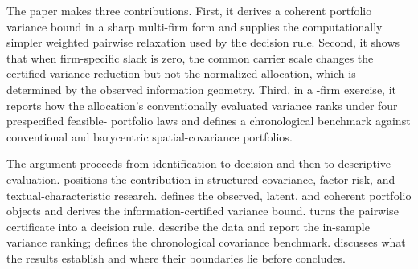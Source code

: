 The paper makes three contributions.
First, it derives a coherent portfolio variance bound in a sharp
multi-firm form and supplies the computationally simpler weighted
pairwise relaxation used by the decision rule.
Second, it shows that when firm-specific slack is zero, the common
carrier scale changes the certified variance reduction but not the
normalized allocation, which is determined by the observed information geometry.
Third, in a -firm exercise, it reports how the allocation's
conventionally evaluated variance ranks under four prespecified feasible-
portfolio laws and defines a chronological benchmark against conventional and
barycentric spatial-covariance portfolios.

The argument proceeds from identification to decision and then to
descriptive evaluation.
 positions the contribution in structured
covariance, factor-risk, and textual-characteristic research.
 defines the observed, latent, and coherent portfolio
objects and derives the information-certified variance bound.
 turns the pairwise certificate into a decision rule.
 describe the data and report the
in-sample variance ranking;  defines
the chronological covariance benchmark.
 discusses what the results establish and where
their boundaries lie before  concludes.
